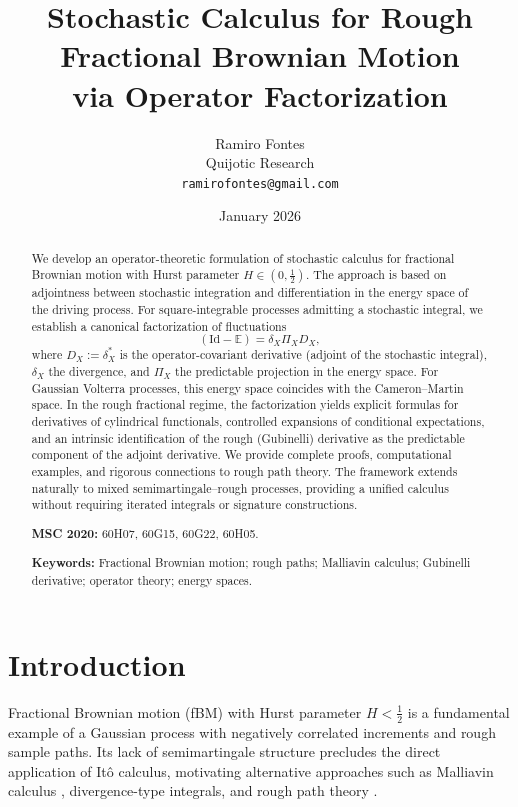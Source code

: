\documentclass[11pt,a4paper]{article}
\title{Stochastic Calculus for Rough Fractional Brownian Motion\\
via Operator Factorization}
\author{Ramiro Fontes\\
Quijotic Research\\
\texttt{ramirofontes@gmail.com}}
\date{January 2026}
\theoremstyle{plain}
\theoremstyle{definition}
\theoremstyle{remark}
\newcommand{\E}{\mathbb{E}}
\newcommand{\Id}{\mathrm{Id}}
\begin{document}
\maketitle

\begin{abstract}
We develop an operator-theoretic formulation of stochastic calculus for fractional Brownian motion with Hurst parameter $H \in (0,\frac{1}{2})$. The approach is based on adjointness between stochastic integration and differentiation in the energy space of the driving process. For square-integrable processes admitting a stochastic integral, we establish a canonical factorization of fluctuations
\[
(\Id -\E) = \delta_X\Pi_X D_X,
\]
where $D_X := \delta_X^*$ is the operator-covariant derivative (adjoint of the stochastic integral), $\delta_X$ the divergence, and $\Pi_X$ the predictable projection in the energy space. For Gaussian Volterra processes, this energy space coincides with the Cameron--Martin space. In the rough fractional regime, the factorization yields explicit formulas for derivatives of cylindrical functionals, controlled expansions of conditional expectations, and an intrinsic identification of the rough (Gubinelli) derivative as the predictable component of the adjoint derivative. We provide complete proofs, computational examples, and rigorous connections to rough path theory. The framework extends naturally to mixed semimartingale--rough processes, providing a unified calculus without requiring iterated integrals or signature constructions.

\medskip
\noindent\textbf{MSC 2020:} 60H07, 60G15, 60G22, 60H05.

\medskip
\noindent\textbf{Keywords:} Fractional Brownian motion; rough paths; Malliavin calculus; Gubinelli derivative; operator theory; energy spaces.
\end{abstract}

\section{Introduction}

Fractional Brownian motion (fBM) with Hurst parameter $H < \frac{1}{2}$ is a fundamental example of a Gaussian process with negatively correlated increments and rough sample paths. Its lack of semimartingale structure precludes the direct application of It\^o calculus, motivating alternative approaches such as Malliavin calculus \cite{DU99, PT00}, divergence-type integrals, and rough path theory \cite{Lyons98, FV10, FH14}.
\end{document}
